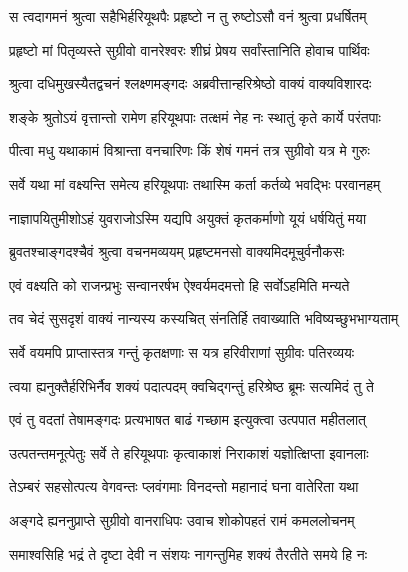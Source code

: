 \twolineshloka
{स त्वदागमनं श्रुत्वा सहैभिर्हरियूथपैः}
{प्रहृष्टो न तु रुष्टोऽसौ वनं श्रुत्वा प्रधर्षितम्} %

\twolineshloka
{प्रहृष्टो मां पितृव्यस्ते सुग्रीवो वानरेश्वरः}
{शीघ्रं प्रेषय सर्वांस्तानिति होवाच पार्थिवः} %

\twolineshloka
{श्रुत्वा दधिमुखस्यैतद्वचनं श्लक्ष्णमङ्गदः}
{अब्रवीत्तान्हरिश्रेष्ठो वाक्यं वाक्यविशारदः} %

\twolineshloka
{शङ्के श्रुतोऽयं वृत्तान्तो रामेण हरियूथपाः}
{तत्क्षमं नेह नः स्थातुं कृते कार्ये परंतपाः} %

\twolineshloka
{पीत्वा मधु यथाकामं विश्रान्ता वनचारिणः}
{किं शेषं गमनं तत्र सुग्रीवो यत्र मे गुरुः} %

\twolineshloka
{सर्वे यथा मां वक्ष्यन्ति समेत्य हरियूथपाः}
{तथास्मि कर्ता कर्तव्ये भवद्भिः परवानहम्} %

\twolineshloka
{नाज्ञापयितुमीशोऽहं युवराजोऽस्मि यद्यपि}
{अयुक्तं कृतकर्माणो यूयं धर्षयितुं मया} %

\twolineshloka
{ब्रुवतश्चाङ्गदश्चैवं श्रुत्वा वचनमव्ययम्}
{प्रहृष्टमनसो वाक्यमिदमूचुर्वनौकसः} %

\twolineshloka
{एवं वक्ष्यति को राजन्प्रभुः सन्वानरर्षभ}
{ऐश्वर्यमदमत्तो हि सर्वोऽहमिति मन्यते} %

\twolineshloka
{तव चेदं सुसदृशं वाक्यं नान्यस्य कस्यचित्}
{संनतिर्हि तवाख्याति भविष्यच्छुभभाग्यताम्} %

\twolineshloka
{सर्वे वयमपि प्राप्तास्तत्र गन्तुं कृतक्षणाः}
{स यत्र हरिवीराणां सुग्रीवः पतिरव्ययः} %

\twolineshloka
{त्वया ह्यनुक्तैर्हरिभिर्नैव शक्यं पदात्पदम्}
{क्वचिद्गन्तुं हरिश्रेष्ठ ब्रूमः सत्यमिदं तु ते} %

\twolineshloka
{एवं तु वदतां तेषामङ्गदः प्रत्यभाषत}
{बाढं गच्छाम इत्युक्त्वा उत्पपात महीतलात्} %

\twolineshloka
{उत्पतन्तमनूत्पेतुः सर्वे ते हरियूथपाः}
{कृत्वाकाशं निराकाशं यज्ञोत्क्षिप्ता इवानलाः} %

\twolineshloka
{तेऽम्बरं सहसोत्पत्य वेगवन्तः प्लवंगमाः}
{विनदन्तो महानादं घना वातेरिता यथा} %

\twolineshloka
{अङ्गदे ह्यननुप्राप्ते सुग्रीवो वानराधिपः}
{उवाच शोकोपहतं रामं कमललोचनम्} %

\twolineshloka
{समाश्वसिहि भद्रं ते दृष्टा देवी न संशयः}
{नागन्तुमिह शक्यं तैरतीते समये हि नः} %


